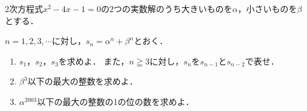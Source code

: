 \documentclass[../../main.tex]{subfiles}
\begin{document}
2次方程式$x^2-4x-1=0$の2つの実数解のうち大きいものを$\alpha$，小さいものを$\beta$とする．

$n=1,2,3,\cdots$に対し，$s_n=\alpha^n+\beta^n$とおく．
\begin{enumerate}
  \item $s_1$，$s_2$，$s_3$を求めよ．
    また，$n \geqq 3$に対し，$s_n$を$s_{n-1}$と$s_{n-2}$で表せ．
  \item $\beta^3$以下の最大の整数を求めよ．
  \item $\alpha^{2003}$以下の最大の整数の1の位の数を求めよ．
\end{enumerate}
\end{document}
